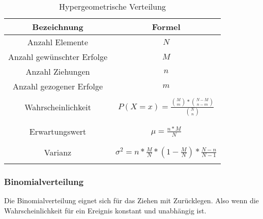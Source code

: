 \documentclass[12pt]{scrartcl}
\begin{document}
\begin{table}[h]
    \begin{tabular}{ | c | c | }
        \hline
        Bezeichnung                & Formel                                                           \\
        \hline
        Anzahl Elemente            & $N$                                                              \\
        Anzahl gewünschter Erfolge & $M$                                                              \\
        Anzahl Ziehungen           & $n$                                                              \\
        Anzahl gezogener Erfolge   & $m$                                                              \\
        \hline                     &                                                                  \\
        Wahrscheinlichkeit         & $P(X=x) = \frac{\binom{M}{m} * \binom{N-M}{n-m}}{\binom{N}{n}}$  \\&\\&\\
        Erwartungswert             & $\mu = \frac{n*M}{N}$                                            \\&\\&\\
        Varianz                    & $\sigma^2 = n * \frac{M}{N} * (1-\frac{M}{N}) * \frac{N-n}{N-1}$ \\&\\
        \hline
    \end{tabular}
    \caption{Hypergeometrische Verteilung}
\end{table}

\subsubsection{Binomialverteilung}

Die Binomialverteilung eignet sich für das Ziehen mit Zurücklegen.
Also wenn die Wahrscheinlichkeit für ein Ereignis konstant und unabhängig ist.
\end{document}

